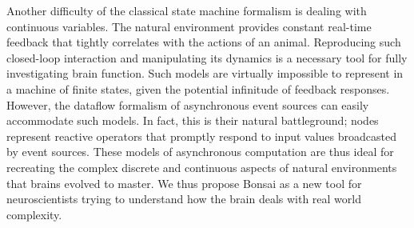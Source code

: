Another difficulty of the classical state machine formalism is dealing with continuous variables. The natural environment provides constant real-time feedback that tightly correlates with the actions of an animal. Reproducing such closed-loop interaction and manipulating its dynamics is a necessary tool for fully investigating brain function. Such models are virtually impossible to represent in a machine of finite states, given the potential infinitude of feedback responses. However, the dataflow formalism of asynchronous event sources can easily accommodate such models. In fact, this is their natural battleground; nodes represent reactive operators that promptly respond to input values broadcasted by event sources. These models of asynchronous computation are thus ideal for recreating the complex discrete and continuous aspects of natural environments that brains evolved to master. We thus propose Bonsai as a new tool for neuroscientists trying to understand how the brain deals with real world complexity.

\pagebreak


